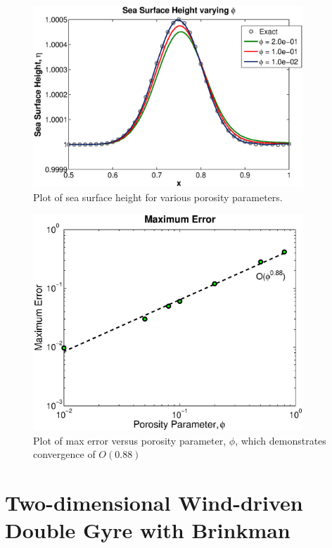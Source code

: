 \begin{center}
\begin{figure}[h!]
\centering
  \includegraphics[width=4in]{Images/etaconvergence}
  \caption[Sea surface height convergence plot]{Plot of sea surface height for various porosity parameters.}\label{f:etaconvergence}
\end{figure}
\end{center}

\begin{center}
\begin{figure}[h!]
\centering
  \includegraphics[width=4in]{Images/maxerrorconvergence}
  \caption[Maximum error convergence plot.]{Plot of max error versus porosity parameter, $\phi$, which demonstrates convergence of $O(0.88)$}\label{f:maxerrorconvergence}
\end{figure}
\end{center}


\section{Two-dimensional Wind-driven Double Gyre with Brinkman}

